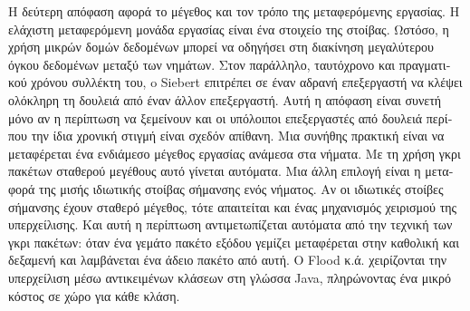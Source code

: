 \begin{greek}
Η δεύτερη απόφαση αφορά το μέγεθος και τον τρόπο της μεταφερόμενης
εργασίας. Η ελάχιστη μεταφερόμενη μονάδα εργασίας είναι ένα
στοιχείο της στοίβας. Ωστόσο, η χρήση μικρών δομών δεδομένων
μπορεί να οδηγήσει στη διακίνηση μεγαλύτερου όγκου δεδομένων
μεταξύ των νημάτων. Στον παράλληλο, ταυτόχρονο και πραγματικού
χρόνου συλλέκτη του, o Siebert \cite{DBLP:conf/iwmm/Siebert10}
επιτρέπει σε έναν αδρανή επεξεργαστή να κλέψει ολόκληρη τη
δουλειά από έναν άλλον επεξεργαστή. Αυτή η απόφαση είναι συνετή
μόνο αν η περίπτωση να ξεμείνουν και οι υπόλοιποι επεξεργαστές
από δουλειά περίπου την ίδια χρονική στιγμή είναι σχεδόν
απίθανη. Μια συνήθης πρακτική είναι να μεταφέρεται ένα ενδιάμεσο
μέγεθος εργασίας ανάμεσα στα νήματα. Με τη χρήση γκρι πακέτων
σταθερού μεγέθους αυτό γίνεται αυτόματα. Μια άλλη επιλογή
είναι η μεταφορά της μισής ιδιωτικής στοίβας σήμανσης ενός
νήματος. Αν οι ιδιωτικές στοίβες σήμανσης έχουν σταθερό
μέγεθος, τότε απαιτείται και ένας μηχανισμός χειρισμού της
υπερχείλισης. Και αυτή η περίπτωση αντιμετωπίζεται αυτόματα
από την τεχνική των γκρι πακέτων: όταν ένα γεμάτο πακέτο
εξόδου γεμίζει μεταφέρεται στην καθολική και δεξαμενή και
λαμβάνεται ένα άδειο πακέτο από αυτή. Ο Flood κ.ά. 
\cite{DBLP:conf/jvm/FloodDSZ01} χειρίζονται την υπερχείλιση
μέσω αντικειμένων κλάσεων στη γλώσσα Java, πληρώνοντας ένα
μικρό κόστος σε χώρο για κάθε κλάση.


\end{greek}

